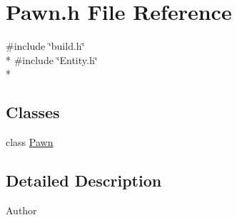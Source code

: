 \section{Pawn.\-h File Reference}
\label{_pawn_8h}
{\ttfamily \#include \char`\"{}build.\-h\char`\"{}}\\*
{\ttfamily \#include \char`\"{}Entity.\-h\char`\"{}}\\*
\subsection*{Classes}
\begin{DoxyCompactItemize}
\item 
class \hyperlink{class_pawn}{Pawn}
\end{DoxyCompactItemize}


\subsection{Detailed Description}
\begin{DoxyAuthor}{Author}

\end{DoxyAuthor}

